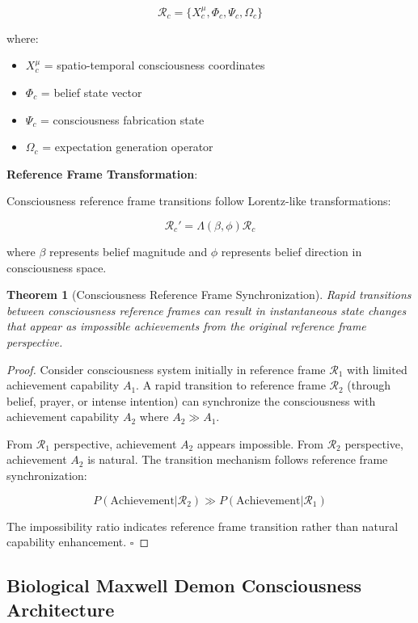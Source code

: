 \documentclass[12pt,a4paper]{article}
\newtheorem{theorem}{Theorem}[section]
\begin{document}
$$\mathcal{R}_c = \{X_c^\mu, \Phi_c, \Psi_c, \Omega_c\}$$

where:
\begin{itemize}
\item $X_c^\mu$ = spatio-temporal consciousness coordinates
\item $\Phi_c$ = belief state vector
\item $\Psi_c$ = consciousness fabrication state
\item $\Omega_c$ = expectation generation operator
\end{itemize}

\textbf{Reference Frame Transformation}: 

Consciousness reference frame transitions follow Lorentz-like transformations:

$$\mathcal{R}_c' = \Lambda(\beta, \phi) \mathcal{R}_c$$

where $\beta$ represents belief magnitude and $\phi$ represents belief direction in consciousness space.

\begin{theorem}[Consciousness Reference Frame Synchronization]
Rapid transitions between consciousness reference frames can result in instantaneous state changes that appear as impossible achievements from the original reference frame perspective.
\end{theorem}

\begin{proof}
Consider consciousness system initially in reference frame $\mathcal{R}_1$ with limited achievement capability $A_1$. A rapid transition to reference frame $\mathcal{R}_2$ (through belief, prayer, or intense intention) can synchronize the consciousness with achievement capability $A_2$ where $A_2 \gg A_1$.

From $\mathcal{R}_1$ perspective, achievement $A_2$ appears impossible. From $\mathcal{R}_2$ perspective, achievement $A_2$ is natural. The transition mechanism follows reference frame synchronization:

$$P(\text{Achievement}|\mathcal{R}_2) \gg P(\text{Achievement}|\mathcal{R}_1)$$

The impossibility ratio indicates reference frame transition rather than natural capability enhancement. $\square$
\end{proof}

\subsection{Biological Maxwell Demon Consciousness Architecture}
\end{document}

